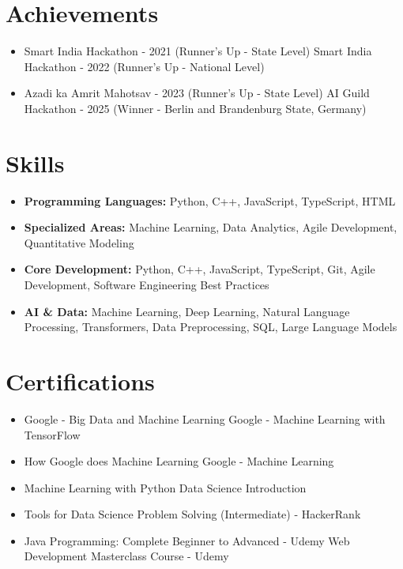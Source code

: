 \documentclass[a4paper,10pt]{article}
\begin{document}
\section*{Achievements}
\begin{itemize}
\item Smart India Hackathon - 2021 (Runner's Up - State Level) \hfill Smart India Hackathon - 2022 (Runner's Up - National Level)
\item Azadi ka Amrit Mahotsav - 2023 (Runner's Up - State Level) \hfill AI Guild Hackathon - 2025 (Winner - Berlin and Brandenburg State, Germany)
\end{itemize}

\section*{Skills}
\begin{itemize}
  \item \textbf{Programming Languages:} Python, C++, JavaScript, TypeScript, HTML
  \item \textbf{Specialized Areas:} Machine Learning, Data Analytics, Agile Development, Quantitative Modeling
  \item \textbf{Core Development:} Python, C++, JavaScript, TypeScript, Git, Agile Development, Software Engineering Best Practices
  \item \textbf{AI \& Data:} Machine Learning, Deep Learning, Natural Language Processing, Transformers, Data Preprocessing, SQL, Large Language Models
\end{itemize}

\section*{Certifications}
\begin{itemize}
\item Google - Big Data and Machine Learning \hfill Google - Machine Learning with TensorFlow
\item How Google does Machine Learning \hfill Google - Machine Learning
\item Machine Learning with Python \hfill Data Science Introduction
\item Tools for Data Science \hfill Problem Solving (Intermediate) - HackerRank
\item Java Programming: Complete Beginner to Advanced - Udemy \hfill Web Development Masterclass Course - Udemy
\end{itemize}
\end{document}
